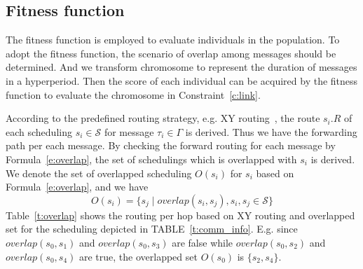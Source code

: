\documentclass[journal]{IEEEtran}
\newcommand{\calS}{\mathcal{S}}
\theoremstyle{remark}
\begin{document}
\subsection{Fitness function \label{s:fit}}

The fitness function is employed to evaluate individuals in the population.
To adopt the fitness function, 
the scenario of overlap among messages should be determined.
And we transform chromosome to represent the duration of messages in a hyperperiod.
Then the score of each individual can be acquired by the fitness function to evaluate the chromosome in Constraint~\ref{c:link}.

According to the predefined routing strategy,
e.g. XY routing~\cite{DBLP:books/daglib/0087651},
the route $s_i.R$ of each scheduling $s_i\in \calS$ for message $\tau_i\in\Gamma$ is derived.
Thus we have the forwarding path per each message.
By checking the forward routing for each message by Formula~\ref{e:overlap},
the set of schedulings which is overlapped with $s_i$ is derived.
We denote the set of overlapped scheduling $O(s_i)$ for $s_i$ based on Formula~\ref{e:overlap},
and we have
\begin{equation}
O(s_i) = \{ s_j \mid overlap(s_i,s_j),s_i,s_j\in \calS  \}
\end{equation}
Table~\ref{t:overlap} shows the routing per hop based on XY routing and overlapped set for the scheduling depicted in TABLE~\ref{t:comm_info}.
E.g. since $overlap(s_{0},s_{1})$ and $overlap(s_{0},s_{3})$ are false while $overlap(s_{0},s_{2})$ and $overlap(s_{0},s_{4})$ are true, the overlapped set $O(s_{0})$ is $\{ s_{2},s_{4} \}$. 
\end{document}
